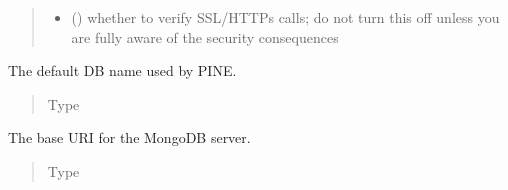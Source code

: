 \documentclass[letterpaper,10pt,english]{sphinxmanual}
\begin{document}
\begin{fulllineitems}
\begin{quote}
\begin{description}
\begin{itemize}
\item {} 
\sphinxAtStartPar
{} (\sphinxstyleliteralemphasis{\sphinxupquote{, }}) \textendash{} whether to verify SSL/HTTPs calls; do not turn this off unless you
are fully aware of the security consequences

\end{itemize}

\end{description}\end{quote}

\begin{fulllineitems}
\label{\detokenize{autoapi/pine/client/client/index:pine.client.client.EveClient.DEFAULT_DBNAME}}
\sphinxAtStartPar
The default DB name used by PINE.
\begin{quote}\begin{description}
\item[{Type}] \leavevmode
\sphinxAtStartPar
{}

\end{description}\end{quote}

\end{fulllineitems}


\begin{fulllineitems}
\label{\detokenize{autoapi/pine/client/client/index:pine.client.client.EveClient.mongo_base_uri}}
\sphinxAtStartPar
The base URI for the MongoDB server.
\begin{quote}\begin{description}
\item[{Type}] \leavevmode
\sphinxAtStartPar
{}


\end{description}
\end{quote}
\end{fulllineitems}
\end{fulllineitems}
\end{document}
